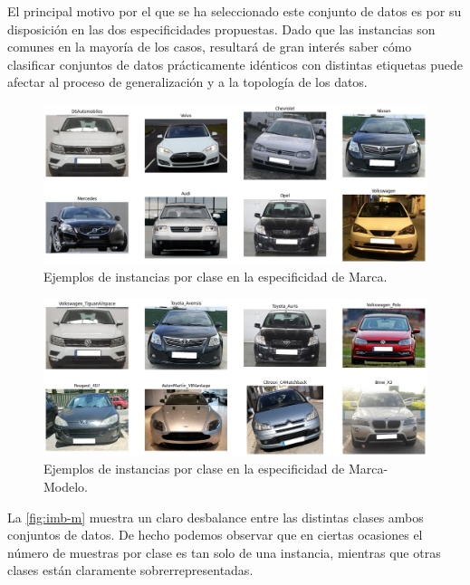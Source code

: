 El principal motivo por el que se ha seleccionado este conjunto de datos es por su disposición en las dos especificidades propuestas. Dado que las instancias son comunes en la mayoría de los casos, resultará de gran interés saber cómo clasificar conjuntos de datos prácticamente idénticos con distintas etiquetas puede afectar al proceso de generalización y a la topología de los datos.

\begin{figure}[H]
	\centering
	\includegraphics[width=120mm]{img/marca-example.png}
	\caption{Ejemplos de instancias por clase en la especificidad de Marca.}
	\label{fig:example-m}
\end{figure}

\begin{figure}[H]
	\centering
	\includegraphics[width=120mm]{img/marca-modelo-example.png}
	\caption{Ejemplos de instancias por clase en la especificidad de Marca-Modelo.}
	\label{fig:example-mm}
\end{figure}

La \autoref{fig:imb-m} muestra un claro desbalance entre las distintas clases ambos conjuntos de datos. De hecho podemos observar que en ciertas ocasiones el número de muestras por clase es tan solo de una instancia, mientras que otras clases están claramente sobrerrepresentadas.

